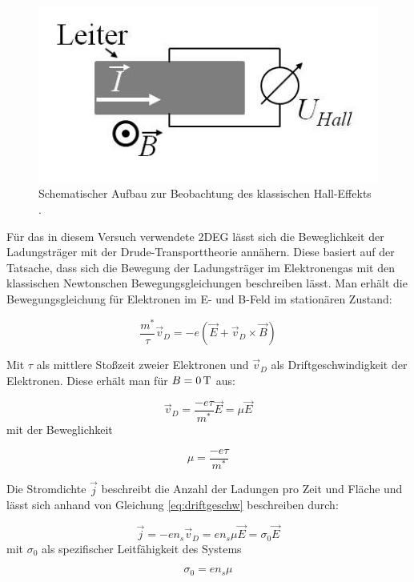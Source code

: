 \begin{figure}[h]
	\centering
	\includegraphics[width=0.4\linewidth]{images/Anleitungsheft/U_HALL_Anleitungsheft.png}
	\caption[Halleffekt klassisch]{Schematischer Aufbau zur Beobachtung des klassischen Hall-Effekts \cite{anleitung}.}
	\label{fig:U_HALL_Anleitungsheft}
\end{figure}

Für das in diesem Versuch verwendete 2DEG lässt sich die Beweglichkeit der Ladungsträger mit der Drude-Transporttheorie annähern. Diese basiert auf der Tatsache, dass sich die Bewegung der Ladungsträger im Elektronengas mit den klassischen Newtonschen Bewegungsgleichungen beschreiben lässt.
Man erhält die Bewegungsgleichung für Elektronen im E- und B-Feld im stationären Zustand:

\begin{equation}
\frac{m^*}{\tau} \vec{v}_D = -e(\vec{E}+\vec{v}_D \times \vec{B})
\label{eq:beweggl_stat}
\end{equation}

Mit $\tau$ als mittlere Stoßzeit zweier Elektronen und $\vec{v}_D$ als Driftgeschwindigkeit der Elektronen. Diese erhält man für $B=\unit[0]{T}$ aus:

\begin{equation}
\vec{v}_D=\frac{-e\tau}{m^*}\vec{E}=\mu\vec{E}
\label{eq:driftgeschw}
\end{equation}
mit der Beweglichkeit

\begin{equation}
\mu=\frac{-e\tau}{m^*}
\label{eq:bewegl_def}
\end{equation}

Die Stromdichte $\vec{j}$ beschreibt die Anzahl der Ladungen pro Zeit und Fläche und lässt sich anhand von Gleichung \ref{eq:driftgeschw} beschreiben durch:

\begin{equation}
\vec{j}=-en_s\vec{v}_D=en_s\mu\vec{E}=\sigma_0\vec{E}
\label{eq:stromdichte_herleitung}
\end{equation}
mit $\sigma_0$ als spezifischer Leitfähigkeit des Systems

\begin{equation}
\sigma_0=en_s\mu
\label{eq:sigma_def}
\end{equation}

